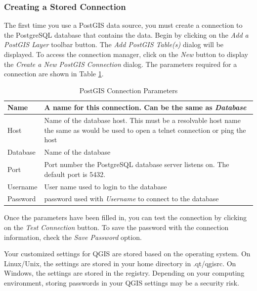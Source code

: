\documentclass[10pt,english]{article}
\newcommand\qgistip[1]{\raggedright\small{#1}}
\begin{document}
\begin{onehalfspace}
\subsubsection{Creating a Stored Connection}
The first time
you use a PostGIS data source, you must create a connection to the PostgreSQL
database that contains the data. Begin by clicking on the \textit{Add a PostGIS
Layer} toolbar button. The \textsl{Add PostGIS Table(s)} dialog will be
displayed. To access the connection manager, click on the \textsl{New} button to
display the \textsl{Create a New PostGIS Connection} dialog. The parameters
required for a connection are shown in Table \ref{tab:postgis_connection_parms}.
\begin{table}[h]
\centering
\caption{PostGIS Connection Parameters}\label{tab:postgis_connection_parms}\medskip
 \begin{tabular}{|l|p{5in}|}
\hline Name & A name for this connection. Can be the same as \textsl{Database}
\\
\hline Host \index{PostgreSQL!host}
& Name of the database host. This must be a resolvable host name the same as would be used to open a telnet connection or ping the host \\
\hline Database \index{PostgreSQL!database} & Name of the database  \\
\hline Port \index{PostgreSQL!port}& Port number the PostgreSQL database server listens on. The default port is 5432.\\
\hline Username \index{PostgreSQL!username}& User name used to login to the database \\
\hline Password \index{PostgreSQL!password}& password used with \textsl{Username} to connect to the database\\
\hline
\end{tabular}
\end{table}
Once the parameters have been filled in, you can test the connection by clicking
on the \textsl{Test Connection} button. To save the password with the connection information, check the \textsl{Save Password} option.
\begin{Tip}\caption{\textsc{QGIS User Settings and
Security}}
\qgistip{Your customized settings for QGIS are stored based on the operating system. On Linux/Unix, the settings are stored in your home directory in .qt/qgisrc. On Windows, the settings are stored in the registry. Depending on your computing environment, storing passwords in your QGIS settings may be a security risk.
}
\end{Tip}

\end{onehalfspace}
\end{document}
